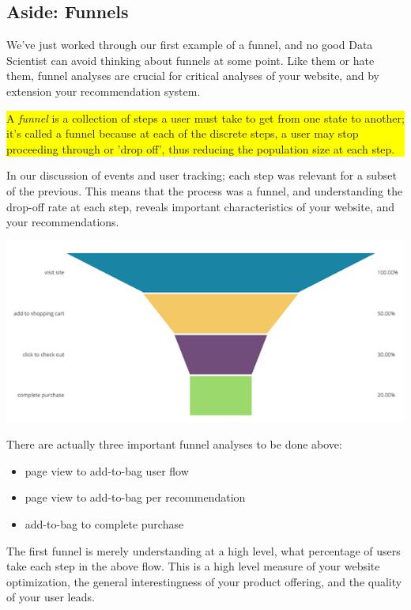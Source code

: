 \subsection{Aside: Funnels}

We've just worked through our first example of a funnel, and no good Data Scientist can avoid thinking about funnels at some point. Like them or hate them, funnel analyses are crucial for critical analyses of your website, and by extension your recommendation system.


\vspace{10pt}
\colorbox{yellow}{\parbox{\textwidth-20pt}{ A \emph{funnel} is a collection of steps a user must take to get from one state to another; it's called a funnel because at each of the discrete steps, a user may stop proceeding through or 'drop off', thus reducing the population size at each step.
}}

\vspace{10pt}
In our discussion of events and user tracking; each step was relevant for a subset of the previous. This means that the process was a funnel, and understanding the drop-off rate at each step, reveals important characteristics of your website, and your recommendations.

\vspace{10pt}
\includegraphics[width=\textwidth-10pt]{book-text/funnel.png}

There are actually three important funnel analyses to be done above:

\begin{itemize}
\item page view to add-to-bag user flow
\item page view to add-to-bag per recommendation
\item add-to-bag to complete purchase
\end{itemize}

The first funnel is merely understanding at a high level, what percentage of users take each step in the above flow. This is a high level measure of your website optimization, the general interestingness of your product offering, and the quality of your user leads.

